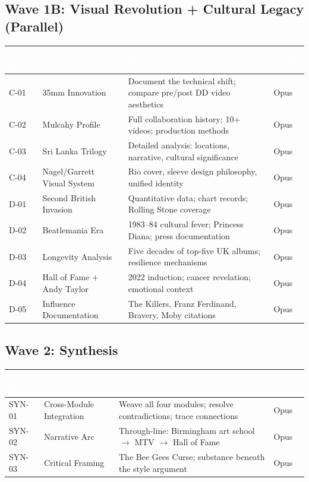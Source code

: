 \documentclass[11pt,letterpaper]{article}
\newcommand{\tableheader}[1]{\textbf{\sffamily\textcolor{white}{#1}}}
\begin{document}
\subsection{Wave 1B: Visual Revolution + Cultural Legacy (Parallel)}

\begin{center}
\begin{tabularx}{\textwidth}{L{2cm}L{3.5cm}XC{2cm}}
\toprule
{}
\tableheader{Task ID} & \tableheader{Task} & \tableheader{Description} & \tableheader{Model} \\
\midrule
C-01 & 35mm Innovation & Document the technical shift; compare pre/post DD video aesthetics & Opus \\
C-02 & Mulcahy Profile & Full collaboration history; 10+ videos; production methods & Opus \\
C-03 & Sri Lanka Trilogy & Detailed analysis: locations, narrative, cultural significance & Opus \\
C-04 & Nagel/Garrett Visual System & Rio cover, sleeve design philosophy, unified identity & Opus \\
D-01 & Second British Invasion & Quantitative data; chart records; Rolling Stone coverage & Opus \\
D-02 & Beatlemania Era & 1983--84 cultural fever; Princess Diana; press documentation & Opus \\
D-03 & Longevity Analysis & Five decades of top-five UK albums; resilience mechanisms & Opus \\
D-04 & Hall of Fame + Andy Taylor & 2022 induction; cancer revelation; emotional context & Opus \\
D-05 & Influence Documentation & The Killers, Franz Ferdinand, Bravery, Moby citations & Opus \\
\bottomrule
\end{tabularx}
\end{center}

\subsection{Wave 2: Synthesis}

\begin{center}
\begin{tabularx}{\textwidth}{L{2cm}L{3.5cm}XC{2cm}}
\toprule
{}
\tableheader{Task ID} & \tableheader{Task} & \tableheader{Description} & \tableheader{Model} \\
\midrule
SYN-01 & Cross-Module Integration & Weave all four modules; resolve contradictions; trace connections & Opus \\
SYN-02 & Narrative Arc & Through-line: Birmingham art school $\rightarrow$ MTV $\rightarrow$ Hall of Fame & Opus \\
SYN-03 & Critical Framing & The Bee Gees Curse; substance beneath the style argument & Opus \\
\bottomrule
\end{tabularx}
\end{center}
\end{document}

